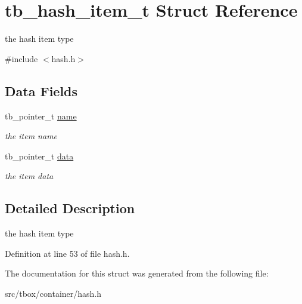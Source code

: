 \hypertarget{structtb__hash__item__t}{\section{tb\-\_\-hash\-\_\-item\-\_\-t Struct Reference}
\label{structtb__hash__item__t}
}


the hash item type  




{\ttfamily \#include $<$hash.\-h$>$}

\subsection*{Data Fields}
\begin{DoxyCompactItemize}
\item 
\hypertarget{structtb__hash__item__t_a7c863f8a6b4ef5ea82f69b8a6b24e57b}{tb\-\_\-pointer\-\_\-t \hyperlink{structtb__hash__item__t_a7c863f8a6b4ef5ea82f69b8a6b24e57b}{name}}\label{structtb__hash__item__t_a7c863f8a6b4ef5ea82f69b8a6b24e57b}

\begin{DoxyCompactList}\small\item\em the item name \end{DoxyCompactList}\item 
\hypertarget{structtb__hash__item__t_a5b8ac4280daf7fb1604586a2508bba97}{tb\-\_\-pointer\-\_\-t \hyperlink{structtb__hash__item__t_a5b8ac4280daf7fb1604586a2508bba97}{data}}\label{structtb__hash__item__t_a5b8ac4280daf7fb1604586a2508bba97}

\begin{DoxyCompactList}\small\item\em the item data \end{DoxyCompactList}\end{DoxyCompactItemize}


\subsection{Detailed Description}
the hash item type 

Definition at line 53 of file hash.\-h.



The documentation for this struct was generated from the following file\-:\begin{DoxyCompactItemize}
\item 
src/tbox/container/hash.\-h\end{DoxyCompactItemize}
